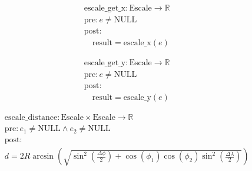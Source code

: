 \[
\begin{aligned}
&\text{escale\_get\_x}: \text{Escale} \to \mathbb{R} \\
&\text{pre}: e \neq \text{NULL} \\
&\text{post}: \\
&\quad \text{result} = \text{escale\_x}(e)
\end{aligned}
\]





\[
\begin{aligned}
&\text{escale\_get\_y}: \text{Escale} \to \mathbb{R} \\
&\text{pre}: e \neq \text{NULL} \\
&\text{post}: \\
&\quad \text{result} = \text{escale\_y}(e)
\end{aligned}
\]



\[
\begin{aligned}
&\text{escale\_distance}: \text{Escale} \times \text{Escale} \to \mathbb{R} \\
&\text{pre}: e_1 \neq \text{NULL} \land e_2 \neq \text{NULL} \\
&\text{post}: \\
&d = 2R \arcsin \left( \sqrt{\sin^2 \left(\frac{\Delta \phi}{2}\right) + \cos(\phi_1) \cos(\phi_2) \sin^2 \left(\frac{\Delta \lambda}{2}\right)} \right)
\end{aligned}
\]



